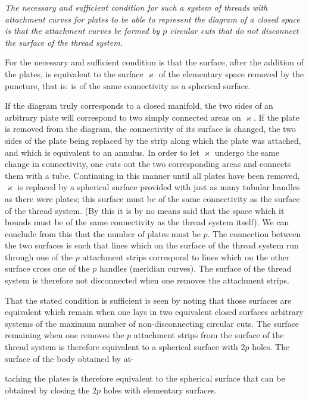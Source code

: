 \documentclass{article}
\begin{document}
\emph{The necessary and sufficient condition for such a system of threads with attachment curves for plates to be able to represent the diagram of a closed space is that the attachment curves be formed by $p$ circular cuts that do not disconnect the surface of the thread system.}

For the necessary and sufficient condition is that the surface, after the addition of the plates, is equivalent to the surface $\varkappa$ of the elementary space removed by the puncture, that is: is of the same connectivity as a spherical surface.

If the diagram truly corresponds to a closed manifold, the two sides of an arbitrary plate will correspond to two simply connected areas on $\varkappa$. If the plate is removed from the diagram, the connectivity of its surface is changed, the two sides of the plate being replaced by the strip along which the plate was attached, and which is equivalent to an annulus. In order to let $\varkappa$ undergo the same change in connectivity, one cuts out the two corresponding areas and connects them with a tube. Continuing in this manner until all plates have been removed, $\varkappa$ is replaced by a spherical surface provided with just as many tubular handles as there were plates; this surface must be of the same connectivity as the surface of the thread system. (By this it is by no means said that the space which it bounds must be of the same connectivity as the thread system itself). We can conclude from this that the number of plates must be $p$. The connection between the two surfaces is such that lines which on the surface of the thread system run through one of the $p$ attachment strips correspond to lines which on the other surface cross one of the $p$ handles (meridian curves). The surface of the thread system is therefore not disconnected when one removes the attachment strips.

That the stated condition is sufficient is seen by noting that those surfaces are equivalent which remain when one lays in two equivalent closed surfaces arbitrary systems of the maximum number of non-disconnecting circular cuts. The surface remaining when one removes the $p$ attachment strips from the surface of the thread system is therefore equivalent to a spherical surface with $2p$ holes. The surface of the body obtained by at-

taching the plates is therefore equivalent to the spherical surface that can be obtained by closing the $2p$ holes with elementary surfaces.
\end{document}
